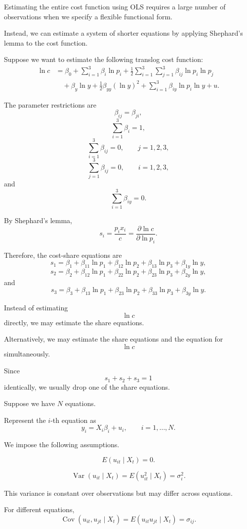 Estimating the entire cost function using OLS requires a large number of observations when we specify a flexible functional form.

Instead, we can estimate a system of shorter equations by applying Shephard's lemma to the cost function.

Suppose we want to estimate the following translog cost function:
\[
\begin{aligned}
\ln c
&=
\beta_0
+
\sum_{i=1}^3 \beta_i\ln p_i
+
\frac{1}{2}
\sum_{i=1}^3
\sum_{j=1}^3
\beta_{ij}\ln p_i\ln p_j \\
&\quad
+
\beta_y\ln y
+
\frac{1}{2}\beta_{yy}(\ln y)^2
+
\sum_{i=1}^3
\beta_{iy}\ln p_i\ln y
+
u.
\end{aligned}
\]

The parameter restrictions are
\[
\beta_{ij}=\beta_{ji},
\]
\[
\sum_{i=1}^3\beta_i=1,
\]
\[
\sum_{i=1}^3\beta_{ij}=0,
\qquad
j=1,2,3,
\]
\[
\sum_{j=1}^3\beta_{ij}=0,
\qquad
i=1,2,3,
\]
and
\[
\sum_{i=1}^3\beta_{iy}=0.
\]

By Shephard's lemma,
\[
s_i
=
\frac{p_i x_i}{c}
=
\frac{\partial \ln c}{\partial \ln p_i}.
\]

Therefore, the cost-share equations are
\[
s_1
=
\beta_1
+
\beta_{11}\ln p_1
+
\beta_{12}\ln p_2
+
\beta_{13}\ln p_3
+
\beta_{1y}\ln y,
\]
\[
s_2
=
\beta_2
+
\beta_{12}\ln p_1
+
\beta_{22}\ln p_2
+
\beta_{23}\ln p_3
+
\beta_{2y}\ln y,
\]
and
\[
s_3
=
\beta_3
+
\beta_{13}\ln p_1
+
\beta_{23}\ln p_2
+
\beta_{33}\ln p_3
+
\beta_{3y}\ln y.
\]

Instead of estimating
\[
\ln c
\]
directly, we may estimate the share equations.

Alternatively, we may estimate the share equations and the equation for
\[
\ln c
\]
simultaneously.

Since
\[
s_1+s_2+s_3=1
\]
identically, we usually drop one of the share equations.

Suppose we have \(N\) equations.

Represent the \(i\)-th equation as
\[
y_i=X_i\beta_i+u_i,
\qquad
i=1,\dots,N.
\]

We impose the following assumptions.

\[
E(u_{it}\mid X_t)=0.
\]

\[
\operatorname{Var}(u_{it}\mid X_t)
=
E(u_{it}^2\mid X_t)
=
\sigma_i^2.
\]

This variance is constant over observations but may differ across equations.

For different equations,
\[
\operatorname{Cov}(u_{it},u_{jt}\mid X_t)
=
E(u_{it}u_{jt}\mid X_t)
=
\sigma_{ij}.
\]



